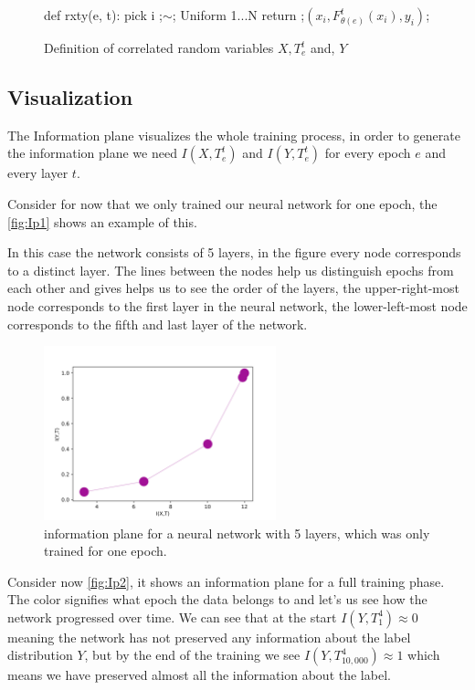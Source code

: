 \begin{figure}[H]
    \begin{pythonfigure}
      def rxty(e, t):
        pick i ;$\sim$; Uniform {1...N}
        return ;$(x_i, F_{\theta(e)}^t(x_i), y_i)$;
    \end{pythonfigure}
    \caption{Definition of correlated random variables $X, T_e^t$ and, $Y$}
    \label{fig:rxty}
\end{figure}

\subsection{Visualization}

The Information plane visualizes the whole training process, in order to
generate the information plane we need $I(X,T_e^t)$ and $I(Y,T_e^t)$ for every
epoch $e$ and every layer $t$.

Consider for now that we only trained our neural network for one epoch, the
\autoref{fig:Ip1} shows an example of this. 

In this case the network consists of 5 layers, in the figure every node
corresponds to a distinct layer. The lines between the nodes help us distinguish
epochs from each other and gives helps us to see the order of the layers, the
upper-right-most node corresponds to the first layer in the neural network, the
lower-left-most node corresponds to the fifth and last layer of the network.

\begin{figure}[H]
  \centering
  \includegraphics[width=0.60\textwidth]{figs/ip_1v2.png}
  \caption{
    information plane for a neural network with 5 layers, which was only trained
    for one epoch.
  }
  \label{fig:Ip1}
\end{figure}

Consider now \autoref{fig:Ip2}, it shows an information plane for a full
training phase. The color signifies what epoch the data belongs to and let's us
see how the network progressed over time. We can see that at the start $I(Y,
T_1^4) \approx 0$ meaning the network has not preserved any information about
the label distribution $Y$, but by the end of the training we see $I(Y,
T_{10,000}^4) \approx 1$ which means we have preserved almost all the information
about the label.


